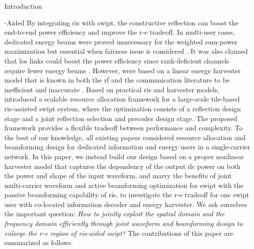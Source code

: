 \begin{section}{Introduction}
	\begin{subsection}{-Aided }
		By integrating \gls{ris} with \gls{swipt}, the constructive reflection can boost the end-to-end power efficiency and improve the \gls{r-e} tradeoff. In multi-user cases, dedicated energy beams were proved unnecessary for the weighted sum-power maximization \cite{Wu2020b} but essential when fairness issue is considered \cite{Tang2019}. It was also claimed that \gls{los} links could boost the power efficiency since rank-deficient channels require fewer energy beams \cite{Wu2020a}. However, \cite{Wu2020b,Tang2019,Wu2020a} were based on a linear energy harvester model that is known in both the \gls{rf} and the communication literature to be inefficient and inaccurate \cite{Clerckx2019,Trotter2009,Clerckx2018,Clerckx2016a,Kim2019,Kim2020a,Kim2021,Clerckx2017,Kim2017,Clerckx2018b,Varasteh2020,Varasteh2019d,Varasteh2020a}. Based on practical \gls{ris} and harvester models, \cite{Xu2021c} introduced a scalable resource allocation framework for a large-scale tile-based \gls{ris}-assisted \gls{swipt} system, where the optimization consists of a reflection design stage and a joint reflection selection and precoder design stage. The proposed framework provides a flexible tradeoff between performance and complexity. To the best of our knowledge, all existing papers considered resource allocation and beamforming design for dedicated information and energy users in a single-carrier network. In this paper, we instead build our design based on a proper nonlinear harvester model that captures the dependency of the output \gls{dc} power on both the power and shape of the input waveform, and marry the benefits of joint multi-carrier waveform and active beamforming optimization for \gls{swipt} with the passive beamforming capability of \gls{ris}, to investigate the \gls{r-e} tradeoff for one \gls{swipt} user with co-located information decoder and energy harvester. We ask ourselves the important question: \emph{How to jointly exploit the spatial domain and the frequency domain efficiently through joint waveform and beamforming design to enlarge the \gls{r-e} region of \gls{ris}-aided \gls{swipt}?} The contributions of this paper are summarized as follows.


\end{subsection}
\end{section}

